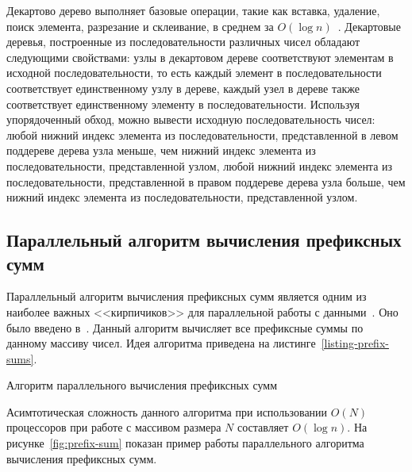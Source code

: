 \documentclass[specification,annotation]{itmo-student-thesis}
\begin{document}
Декартово дерево выполняет базовые операции, такие как вставка, удаление, поиск элемента, 
разрезание и склеивание, в среднем за $O(\log n)$~\cite{cartesian-tree}. Декартовые деревья, построенные 
из последовательности различных чисел обладают следующими свойствами: узлы в декартовом дереве 
соответствуют элементам в исходной последовательности, то есть каждый элемент в последовательности 
соответствует единственному узлу в дереве, каждый узел в дереве также соответствует единственному 
элементу в последовательности. Используя упорядоченный обход, можно вывести исходную 
последовательность чисел: любой нижний индекс элемента из последовательности, 
представленной в левом поддереве дерева узла меньше, чем нижний индекс элемента из последовательности, 
представленной узлом, любой нижний индекс элемента из последовательности, представленной в правом 
поддереве дерева узла больше, чем нижний индекс элемента из последовательности, представленной 
узлом.

\subsection{Параллельный алгоритм вычисления префиксных сумм}

Параллельный алгоритм вычисления префиксных сумм является одним из наиболее важных 
<<кирпичиков>> для параллельной работы с данными~\cite{sengupta06}.
Оно было введено в~\cite{hillis86}.
Данный алгоритм вычисляет все префиксные суммы по данному массиву чисел.
Идея алгоритма приведена на листинге~\ref{listing-prefix-sums}.

\begin{algorithm}[h!]
	\caption{Алгоритм параллельного вычисления префиксных сумм}\label{listing-prefix-sums}
	\begin{algorithmic}[1]
  				\EndIf
			\EndFor
		\EndFor
	\end{algorithmic}
\end{algorithm}

Асимтотическая сложность данного алгоритма при использовании $O(N)$ процессоров при работе с 
массивом размера $N$ составляет $O(\log n)$. На рисунке~\ref{fig:prefix-sum} показан пример работы
параллельного алгоритма вычисления префиксных сумм.
\end{document}
